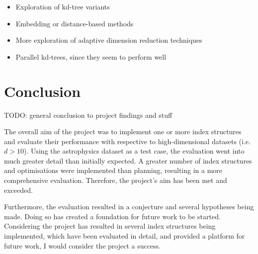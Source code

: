 \begin{itemize}
	\item Exploration of kd-tree variants
	\item Embedding or distance-based methods
	\item More exploration of adaptive dimension reduction techniques
	\item Parallel kd-trees, since they seem to perform well
\end{itemize}

\section{Conclusion}

TODO: general conclusion to project findings and stuff

The overall aim of the project was to implement one or more index structures and evaluate their performance with respective to high-dimensional datasets (i.e. $d > 10$). Using the astrophysics dataset as a test case, the evaluation went into much greater detail than initially expected. A greater number of index structures and optimisations were implemented than planning, resulting in a more comprehensive evaluation. Therefore, the project's aim has been met and exceeded.

Furthermore, the evaluation resulted in a conjecture and several hypotheses being made. Doing so has created a foundation for future work to be started. Considering the project has resulted in several index structures being implemented, which have been evaluated in detail, and provided a platform for future work, I would consider the project a success.